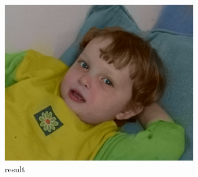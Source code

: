 \documentclass{article}
\begin{document}
\begin{figure}[H]
{\begin{minipage}[t]{0.3\linewidth}
\centering
\includegraphics[width=\linewidth]{result_0.png}
\caption{result}
\end{minipage}
}%
\centering
\end{figure}
\end{document}

